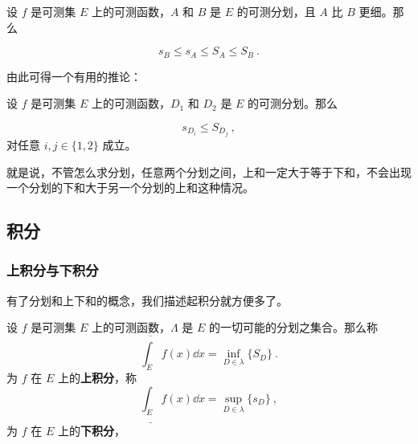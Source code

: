 \begin{lemma}{}\label{Lebes1_lem1}

设 $f$ 是可测集 $E$ 上的可测函数，$A$ 和 $B$ 是 $E$ 的可测分划，且 $A$ 比 $B$ 更细。那么

\begin{equation}
s_B\leq s_A\leq S_A\leq S_B~.
\end{equation}


\end{lemma}

由此可得一个有用的推论：

\begin{corollary}{}\label{Lebes1_cor1}
设 $f$ 是可测集 $E$ 上的可测函数，$D_1$ 和 $D_2$ 是 $E$ 的可测分划。那么

\begin{equation}
s_{D_i}\leq S_{D_j}~,
\end{equation}
对任意 $i, j\in\{1, 2\}$ 成立。

\end{corollary}

就是说，不管怎么求分划，任意两个分划之间，上和一定大于等于下和，不会出现一个分划的下和大于另一个分划的上和这种情况。






\subsection{积分}

\subsubsection{上积分与下积分}

有了分划和上下和的概念，我们描述起积分就方便多了。

\begin{definition}{}

设 $f$ 是可测集 $E$ 上的可测函数，$\Lambda$ 是 $E$ 的一切可能的分划之集合。那么称
\begin{equation}
\overline{\int_E} f(x) \dd x=\inf_{D\in \lambda} \{S_D\}~.
\end{equation}
为 $f$ 在 $E$ 上的\textbf{上积分}，称
\begin{equation}
\underline{\int_E} f(x) \dd x=\sup_{D\in \lambda} \{s_D\}~,
\end{equation}
为 $f$ 在 $E$ 上的\textbf{下积分}，



\end{definition}

